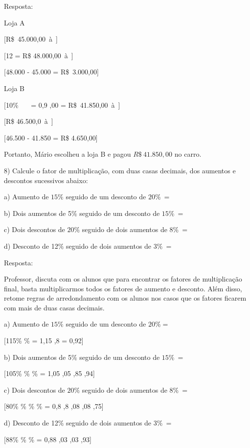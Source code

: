 Resposta:

Loja A

[R\$\ 45.000,00\ à\ ]

[12  = R\$ 48.000,00\ à\ ]

[48.000 - 45.000 = R\$\ 3.000,00]

Loja B

[10\%\ \ \  = 0,9 ,00 = R\$\ 41.850,00\ à\ \text{\ \ }]

[R\$ 46.500,0\ à\ ]

[46.500 - 41.850 = R\$ 4.650,00]

Portanto, Mário escolheu a loja B e pagou \(R\$\ 41.850,00\) no carro.

8) Calcule o fator de multiplicação, com duas casas decimais, dos
aumentos e descontos sucessivos abaixo:

a) Aumento de \(15\%\) seguido de um desconto de \(20\%\  =\)

b) Dois aumentos de 5\(\%\) seguido de um desconto de \(15\%\  =\)

c) Dois descontos de \(20\%\) seguido de dois aumentos de \(8\%\  =\)

d) Desconto de 12\(\%\) seguido de dois aumentos de \(3\%\  =\)

Resposta:

Professor, discuta com os alunos que para encontrar os fatores de
multiplicação final, basta multiplicarmos todos os fatores de aumento e
desconto. Além disso, retome regras de arredondamento com os alunos nos
casos que os fatores ficarem com mais de duas casas decimais.

a) Aumento de \(15\%\) seguido de um desconto de \(20\% =\)

[115\% \% = 1,15 ,8 = 0,92]

b) Dois aumentos de 5\(\%\) seguido de um desconto de \(15\%\  =\)

[105\% \% \% = 1,05 ,05 ,85 ,94]

c) Dois descontos de \(20\%\) seguido de dois aumentos de \(8\%\  =\)

[80\% \% \% \% = 0,8 ,8 ,08 ,08 ,75]

d) Desconto de 12\(\%\) seguido de dois aumentos de \(3\%\  =\)

[88\% \% \% = 0,88 ,03 ,03 ,93]

